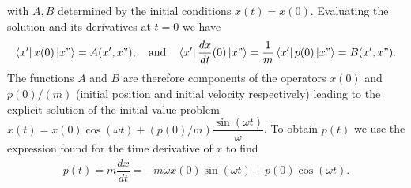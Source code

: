 \documentclass[10pt, a4paper]{article}
\begin{document}
with $A, B$ determined by the initial conditions $x(t) = x(0)$. Evaluating the solution and its derivatives at $t = 0$ we have 
\begin{align*}
    \bra{x'} x(0) \ket{x"} = A(x', x"), \quad \text{and} \quad
    \bra{x'} \dfrac{dx}{dt}(0) \ket{x"} = \dfrac{1}{m}\bra{x'} p(0) \ket{x"}  = B(x', x"). 
\end{align*}
The functions $A$ and $B$ are therefore components of the operators $x(0)$ and $p(0)/(m)$ (initial position and initial velocity respectively) leading to the explicit solution of the initial value problem $x(t) = x(0) \cos(\omega t) +  (p(0)/m) \dfrac{\sin(\omega t)}{\omega}$. To obtain $p(t)$ we use the expression found for the time derivative of $x$ to find 
\begin{align*}
    p(t) = m \dfrac{dx}{dt} =  -m\omega x(0) \sin(\omega t) +  p(0) \cos(\omega t).  
\end{align*}
\end{document}
